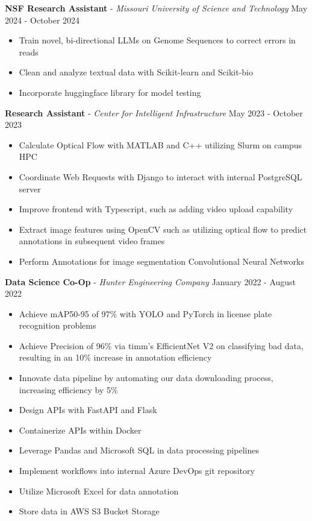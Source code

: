 \documentclass[11pt]{article}
\begin{document}
\textbf{NSF Research Assistant} - \textsl{Missouri University of Science and Technology} \hfill May 2024 - October 2024
\begin{itemize}[noitemsep, topsep=0pt, partopsep=0pt, parsep=0pt, itemsep=0pt]
    \small
    \item Train novel, bi-directional LLMs on Genome Sequences to correct  errors in reads
    \item Clean and analyze textual data with Scikit-learn and Scikit-bio
    \item Incorporate huggingface library for model testing
\end{itemize}

\textbf{Research Assistant} - \textsl{Center for Intelligent Infrastructure} \hfill May 2023 - October 2023
\begin{itemize}[noitemsep, topsep=0pt, partopsep=0pt, parsep=0pt, itemsep=0pt]
    \small
    \item Calculate Optical Flow with MATLAB and C++ utilizing Slurm on campus HPC
    \item Coordinate Web Requests with Django to interact with internal PostgreSQL server
    \item Improve frontend with Typescript, such as adding video upload capability
    \item Extract image features using OpenCV such as utilizing optical flow to predict annotations in subsequent video frames
    \item Perform Annotations for image segmentation Convolutional Neural Networks
\end{itemize}


\textbf{Data Science Co-Op} - \textsl{Hunter Engineering Company} \hfill January 2022 - August 2022
\begin{itemize}[noitemsep, topsep=0pt, partopsep=0pt, parsep=0pt, itemsep=0pt]
    \small
    \item Achieve mAP50-95 of 97\% with YOLO and PyTorch in license plate recognition problems
    \item Achieve Precision of 96\% via timm's EfficientNet V2 on classifying bad data, resulting in an 10\% increase in annotation efficiency
    \item Innovate data pipeline by automating our data downloading process, increasing efficiency by 5\%
    \item Design APIs with FastAPI and Flask
    \item Containerize APIs within Docker
    \item Leverage Pandas and Microsoft SQL in data processing pipelines
    \item Implement workflows into internal Azure DevOps git repository
    \item Utilize Microsoft Excel for data annotation
    \item Store data in AWS S3 Bucket Storage
\end{itemize}
\end{document}
